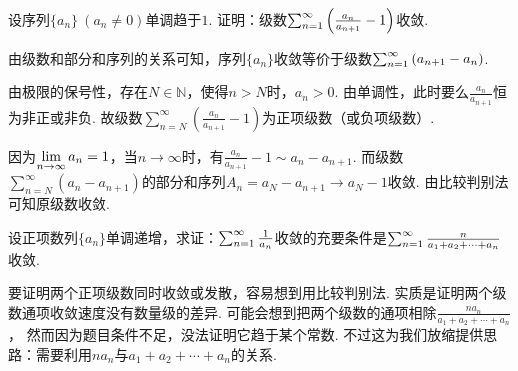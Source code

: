 \begin{example}
\label{ex:ch10-11}
设序列$\{ a_n \}~(a_n \ne 0)$单调趋于$1$. 证明：级数$\ss \left( \frac{a_n}{a_{n+1} } - 1 \right)$收敛.
\end{example}

\begin{analysis}
由级数和部分和序列的关系可知，序列$\{ a_n \}$收敛等价于级数$\ss \left( a_{n+1} - a_{n} \right)$.
\end{analysis}

\begin{solution}
由极限的保号性，存在$N \in \mathbb{N}$，使得$n > N$时，$a_n > 0$.
    由单调性，此时要么$\frac{a_n}{a_{n+1}}$恒为非正或非负.
    故级数$\sum_{n=N}^{\infty} \left( \frac{a_n}{a_{n+1} } - 1 \right)$为正项级数（或负项级数）.

    因为$\limn a_n = 1$，当$n \to \infty$时，有$\frac{a_n}{a_{n+1} } - 1 \sim a_n - a_{n+1}$.
    而级数$\sum_{n=N}^{\infty} \left( a_n - a_{n+1}\right)$的部分和序列$A_n = a_N - a_{n+1} \to a_N - 1$收敛.
    由比较判别法可知原级数收敛.
\end{solution}

\begin{example}
\label{ex:ch10-12}
设正项数列$\{ a_n \}$单调递增，求证：$\ss \frac{1}{a_n}$收敛的充要条件是$\ss \frac{n}{a_1 + a_2 + \cdots + a_n}$收敛.
\end{example}

\begin{analysis}
要证明两个正项级数同时收敛或发散，容易想到用比较判别法.
    实质是证明两个级数通项收敛速度没有数量级的差异.
    可能会想到把两个级数的通项相除$\frac{na_n}{a_1 + a_2 + \cdots + a_n}$，
    然而因为题目条件不足，没法证明它趋于某个常数.
    不过这为我们放缩提供思路：需要利用$na_n$与$a_1 + a_2 + \cdots + a_n$的关系.
\end{analysis}

